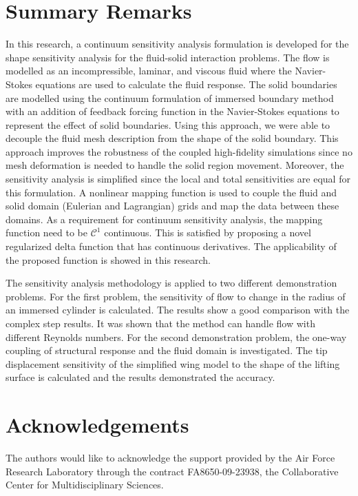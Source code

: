 \documentclass[12pt]{aiaa-pretty}
\begin{document}
\section{Summary Remarks}
In this research, a continuum sensitivity analysis formulation is developed for the shape sensitivity analysis for the fluid-solid interaction problems. The flow is modelled as an incompressible, laminar, and viscous fluid where the Navier-Stokes equations are used to calculate the fluid response. The solid boundaries are modelled using the continuum formulation of immersed boundary method with an addition of feedback forcing function in the Navier-Stokes equations to represent the effect of solid boundaries. Using this approach, we were able to decouple the fluid mesh description from the shape of the solid boundary. This approach improves the robustness of the coupled high-fidelity simulations since no mesh deformation is needed to handle the solid region movement. Moreover, the sensitivity analysis is simplified since the local and total sensitivities are equal for this formulation. A nonlinear mapping function is used to couple the fluid and solid domain (Eulerian and Lagrangian) grids and map the data between these domains. As a requirement for continuum sensitivity analysis, the mapping function need to be $\mathcal{C}^1$ continuous. This is satisfied by proposing a novel regularized delta function that has continuous derivatives. The applicability of the proposed function is showed in this research.

The sensitivity analysis methodology is applied to two different demonstration problems. For the first problem, the sensitivity of flow to change in the radius of an immersed cylinder is calculated. The results show a good comparison with the complex step results. It was shown that the method can handle flow with different Reynolds numbers. For the second demonstration problem, the one-way coupling of structural response and the fluid domain is investigated. The tip displacement sensitivity of the simplified wing model to the shape of the lifting surface is calculated and the results demonstrated the accuracy.
\section*{Acknowledgements}
The authors would like to acknowledge the support provided by the Air Force Research Laboratory through the contract FA8650-09-23938, the Collaborative Center for Multidisciplinary Sciences.


\end{document}
